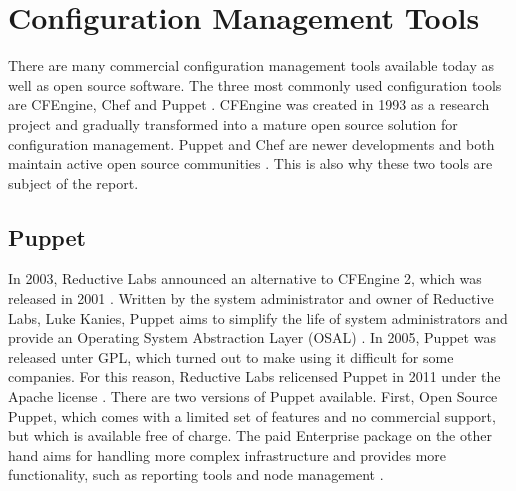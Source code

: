\section{Configuration Management Tools}



There are many commercial configuration management tools available today as well as open source software. The three most commonly used configuration tools are CFEngine, Chef and Puppet \cite{pandey2012investigating}. CFEngine was created in 1993 as a research project and gradually transformed into a mature open source solution for configuration management\cite{Zamboni:2012:LCA:2341102}. Puppet and Chef are newer developments and both maintain active open source communities \cite{pandey2012investigating}. This is also why these two tools are subject of the report.


\subsection{Puppet}

In 2003, Reductive Labs announced an alternative to CFEngine 2, which was released in 2001 \cite{pandey2012investigating}. Written by the system administrator and owner of Reductive Labs, Luke Kanies, Puppet aims to simplify the life of system administrators and provide an Operating System Abstraction Layer (OSAL) \cite{kanies2006puppet}. In 2005, Puppet was released unter GPL, which turned out to make using it difficult for some companies. For this reason, Reductive Labs relicensed Puppet in 2011 under the Apache license \cite{puppetcomapache}. There are two versions of Puppet available. First, Open Source Puppet, which comes with a limited set of features and no commercial support, but which is available free of charge. The paid Enterprise package on the other hand aims for handling more complex infrastructure and provides more functionality, such as reporting tools and node management \cite{puppetcomenterprise}.


